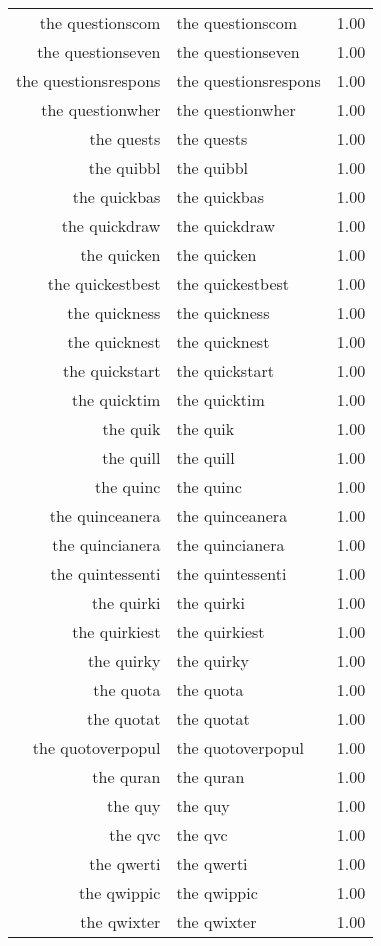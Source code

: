 \begin{table}[ht]
\begin{tabular}{rlr}
  the questionscom & the questionscom & 1.00 \\ 
  the questionseven & the questionseven & 1.00 \\ 
  the questionsrespons & the questionsrespons & 1.00 \\ 
  the questionwher & the questionwher & 1.00 \\ 
  the quests & the quests & 1.00 \\ 
  the quibbl & the quibbl & 1.00 \\ 
  the quickbas & the quickbas & 1.00 \\ 
  the quickdraw & the quickdraw & 1.00 \\ 
  the quicken & the quicken & 1.00 \\ 
  the quickestbest & the quickestbest & 1.00 \\ 
  the quickness & the quickness & 1.00 \\ 
  the quicknest & the quicknest & 1.00 \\ 
  the quickstart & the quickstart & 1.00 \\ 
  the quicktim & the quicktim & 1.00 \\ 
  the quik & the quik & 1.00 \\ 
  the quill & the quill & 1.00 \\ 
  the quinc & the quinc & 1.00 \\ 
  the quinceanera & the quinceanera & 1.00 \\ 
  the quincianera & the quincianera & 1.00 \\ 
  the quintessenti & the quintessenti & 1.00 \\ 
  the quirki & the quirki & 1.00 \\ 
  the quirkiest & the quirkiest & 1.00 \\ 
  the quirky & the quirky & 1.00 \\ 
  the quota & the quota & 1.00 \\ 
  the quotat & the quotat & 1.00 \\ 
  the quotoverpopul & the quotoverpopul & 1.00 \\ 
  the quran & the quran & 1.00 \\ 
  the quy & the quy & 1.00 \\ 
  the qvc & the qvc & 1.00 \\ 
  the qwerti & the qwerti & 1.00 \\ 
  the qwippic & the qwippic & 1.00 \\ 
  the qwixter & the qwixter & 1.00 \\ 

\end{tabular}
\end{table}

